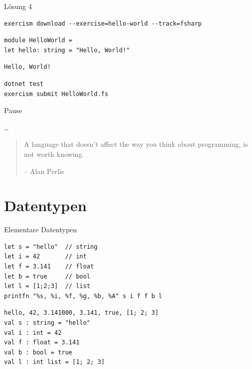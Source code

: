 \documentclass[t]{beamer}
\begin{document}
\begin{frame}[label={sec:org130f3ec},fragile]{Lösung 4}
 \scriptsize
\begin{verbatim}
exercism download --exercise=hello-world --track=fsharp
\end{verbatim}

\begin{verbatim}
module HelloWorld =
let hello: string = "Hello, World!"
\end{verbatim}

\begin{verbatim}
Hello, World!
\end{verbatim}


\begin{verbatim}
dotnet test
exercism submit HelloWorld.fs
\end{verbatim}
\end{frame}

\begin{frame}[label={sec:org9ca040d}]{Pause}
\begin{block}{\ldots{}}
\begin{quote}
A language that doesn’t affect the way you think about programming, is not worth knowing.

\null\hfill-- Alan Perlis
\end{quote}
\end{block}
\end{frame}

\section{Datentypen }
\label{sec:orga3e8a25}

\begin{frame}[label={sec:org3d468f0},fragile]{Elementare Datentypen}
 \scriptsize
\begin{verbatim}
let s = "hello"  // string
let i = 42       // int
let f = 3.141    // float
let b = true     // bool
let l = [1;2;3]  // list
printfn "%s, %i, %f, %g, %b, %A" s i f f b l
\end{verbatim}

\begin{verbatim}
hello, 42, 3.141000, 3.141, true, [1; 2; 3]
val s : string = "hello"
val i : int = 42
val f : float = 3.141
val b : bool = true
val l : int list = [1; 2; 3]
\end{verbatim}
\end{frame}
\end{document}
